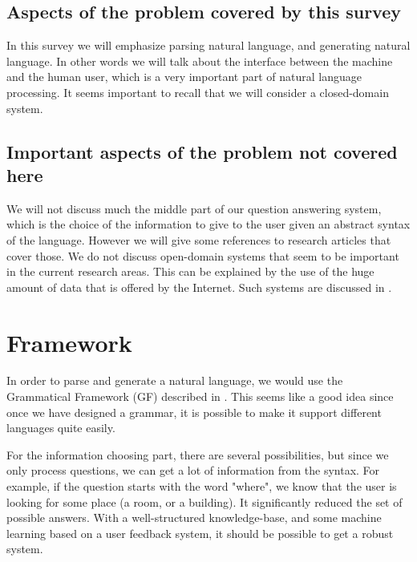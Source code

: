 \documentclass[a4paper,11pt]{article}
\begin{document}
\subsection{Aspects of the problem covered by this survey}
In this survey we will emphasize parsing natural language, and generating
natural language. In other words we will talk about the interface between the
machine and the human user, which is a very important part of natural language
processing. It seems important to recall that we will consider a closed-domain
system.

\subsection{Important aspects of the problem not covered here}
We will not discuss much the middle part of our question answering system, which
is the choice of the information to give to the user given an abstract syntax of
the language. However we will give some references to research articles that
cover those. We do not discuss open-domain systems that seem to be important in
the current research areas. This can be explained by the use of the huge amount
of data that is offered by the Internet. Such systems are discussed in
\cite{designinganopendomainqasystem}.

\section{Framework}
In order to parse and generate a natural language, we would use the Grammatical
Framework (GF) described in \cite{ranta-2011}. This seems like a good idea since
once we have designed a grammar, it is possible to make it support different
languages quite easily.

For the information choosing part, there are several possibilities, but since
we only process questions, we can get a lot of information from the syntax. For
example, if the question starts with the word "where", we know that the user is
looking for some place (a room, or a building). It significantly reduced the set of
possible answers. With a well-structured knowledge-base, and some machine
learning based on a user feedback system, it should be possible to get a robust
system.
\end{document}
